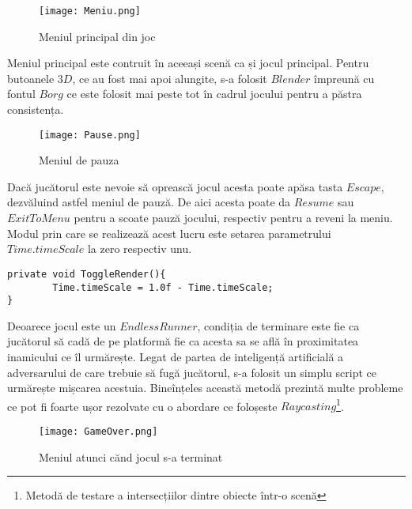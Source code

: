 \vspace{10mm}
\begin{figure}[H]
\centering
\texttt{[image: Meniu.png]} \par
\caption{Meniul principal din joc}
\end{figure}

Meniul principal este contruit în aceeași scenă ca și jocul principal. Pentru butoanele $3D$, ce au fost mai apoi alungite, s-a folosit $Blender$ împreună cu fontul $Borg$ ce este folosit mai peste tot în cadrul jocului pentru a păstra consistența.\par

\vspace{10mm}
\begin{figure}[H]
\centering
\texttt{[image: Pause.png]} \par
\caption{Meniul de pauza}
\end{figure}

Dacă jucătorul este nevoie să oprească jocul acesta poate apăsa tasta $Escape$, dezvăluind astfel meniul de pauză. De aici acesta poate da $Resume$ sau $Exit To Menu$ pentru a scoate pauză jocului, respectiv pentru a reveni la meniu. Modul prin care se realizează acest lucru este setarea parametrului $Time.timeScale$ la zero respectiv unu.\par

\begin{lstlisting}[caption=Exemplu de folosire a $Time.timeScale$]
private void ToggleRender(){
        Time.timeScale = 1.0f - Time.timeScale;
}
\end{lstlisting}

Deoarece jocul este un $EndlessRunner$, condiția de terminare este fie ca jucătorul să cadă de pe platformă fie ca acesta sa se află în proximitatea inamicului ce îl urmărește. Legat de partea de inteligență artificială a adversarului de care trebuie să fugă jucătorul, s-a folosit un simplu script ce urmărește mișcarea acestuia. Bineînțeles această metodă prezintă multe probleme ce pot fi foarte ușor rezolvate cu o abordare ce foloșeste $Raycasting$\footnote{Metodă de testare a intersecțiilor dintre obiecte într-o scenă}.\par

\vspace{10mm}
\begin{figure}[H]
\centering
\texttt{[image: GameOver.png]} \par
\caption{Meniul atunci cănd jocul s-a terminat}
\end{figure}

